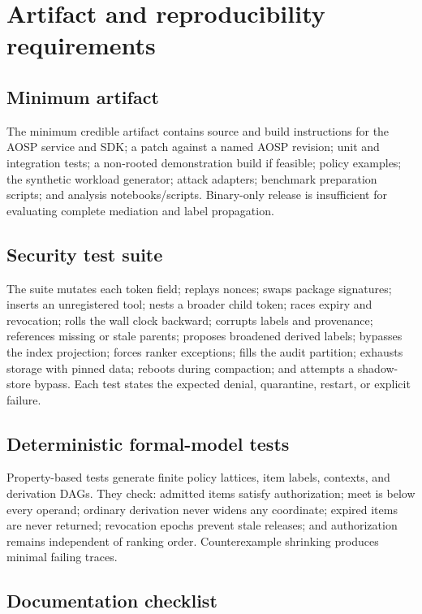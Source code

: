 \section{Artifact and reproducibility requirements}
\label{app:reproducibility}

\subsection{Minimum artifact}

The minimum credible artifact contains source and build instructions for the AOSP service and SDK; a patch against a named AOSP revision; unit and integration tests; a non-rooted demonstration build if feasible; policy examples; the synthetic workload generator; attack adapters; benchmark preparation scripts; and analysis notebooks/scripts. Binary-only release is insufficient for evaluating complete mediation and label propagation.

\subsection{Security test suite}

The suite mutates each token field; replays nonces; swaps package signatures; inserts an unregistered tool; nests a broader child token; races expiry and revocation; rolls the wall clock backward; corrupts labels and provenance; references missing or stale parents; proposes broadened derived labels; bypasses the index projection; forces ranker exceptions; fills the audit partition; exhausts storage with pinned data; reboots during compaction; and attempts a shadow-store bypass. Each test states the expected denial, quarantine, restart, or explicit failure.

\subsection{Deterministic formal-model tests}

Property-based tests generate finite policy lattices, item labels, contexts, and derivation DAGs. They check: admitted items satisfy authorization; meet is below every operand; ordinary derivation never widens any coordinate; expired items are never returned; revocation epochs prevent stale releases; and authorization remains independent of ranking order. Counterexample shrinking produces minimal failing traces.

\subsection{Documentation checklist}

